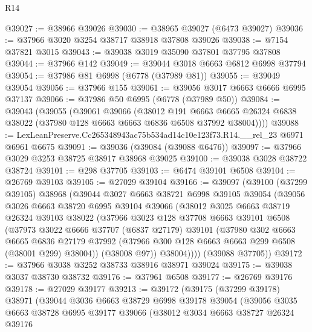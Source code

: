 \begin{lexlean}{R14}
\begin{coremodule}
@39027 := @38966 @39026
@39030 := @38965 @39027 (@6473 @39027)
@39036 := @37966 @3020 @3254 @38717 @38918 @37808 @39026
@39038 := @7154 @37821 @3015
@39043 := @39038 @3019 @35090 @37801 @37795 @37808
@39044 := @37966 @142
@39049 := @39044 @3018 @6663 @6812 @6998 @37794
@39054 := @37986 @81 @6998 (@6778 (@37989 @81))
@39055 := @39049 @39054
@39056 := @37966 @155
@39061 := @39056 @3017 @6663 @6666 @6995 @37137
@39066 := @37986 @50 @6995 (@6778 (@37989 @50))
@39084 := @39043
    (@39055
      (@39061
        @39066
        (@38012
          @191
          @6663
          @6665
          @26324
          @6838
          @38022
          (@37980 @128 @6663 @6663 @6836 @6508 @37992 @38004))))
@39088 := LexLeanPreserve.Cc265348943ac75b534ad14c10e123f73.R14.__rel_23 @6971 @6961 @6675
@39091 := @39036 (@39084 (@39088 @6476))
@39097 := @37966 @3029 @3253 @38725 @38917 @38968 @39025
@39100 := @39038 @3028 @38722 @38724
@39101 := @298 @37705
@39103 := @6474 @39101 @6508
@39104 := @26769 @39103
@39105 := @27029 @39104
@39166 := @39097
    (@39100
      (@37299 @39105)
      @38968
      (@39044
        @3027
        @6663
        @38721
        @6998
        @39105
        @39054
        (@39056
          @3026
          @6663
          @38720
          @6995
          @39104
          @39066
          (@38012
            @3025
            @6663
            @38719
            @26324
            @39103
            @38022
            (@37966
              @3023
              @128
              @37708
              @6663
              @39101
              @6508
              (@37973
                @3022
                @6666
                @37707
                (@6837 @27179)
                @39101
                (@37980
                  @302
                  @6663
                  @6665
                  @6836
                  @27179
                  @37992
                  (@37966 @300 @128 @6663 @6663 @299 @6508 (@38001 @299) @38004))
                (@38008 @97))
              @38004))))
      (@39088 @37705))
@39172 := @37966 @3038 @3252 @38733 @38916 @38971 @39024
@39175 := @39038 @3037 @38730 @38732
@39176 := @37961 @6508
@39177 := @26769 @39176
@39178 := @27029 @39177
@39213 := @39172
    (@39175
      (@37299 @39178)
      @38971
      (@39044
        @3036
        @6663
        @38729
        @6998
        @39178
        @39054
        (@39056
          @3035
          @6663
          @38728
          @6995
          @39177
          @39066
          (@38012
            @3034
            @6663
            @38727
            @26324
            @39176

\end{coremodule}
\end{lexlean}
